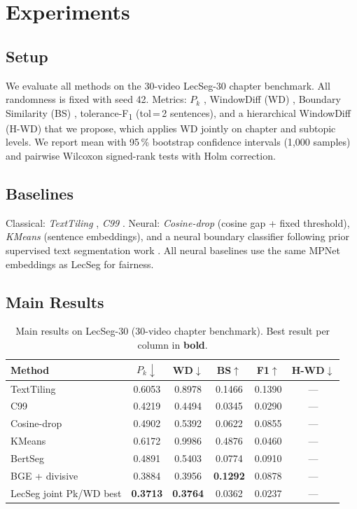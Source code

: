\documentclass[conference]{IEEEtran}
\newcommand{\lecseg}{LecSeg}
\newcommand{\dataset}{LecSeg-30}
\begin{document}
\section{Experiments}

\subsection{Setup}

We evaluate all methods on the 30-video \dataset{} chapter benchmark. All
randomness is fixed with seed 42. Metrics: $P_k$ \cite{beeferman1999_pk},
WindowDiff (WD) \cite{pevzner2002_windowdiff}, Boundary
Similarity (BS) \cite{fournier2013_bs}, tolerance-F\textsubscript{1} (tol\,=\,2 sentences),
and a hierarchical WindowDiff (H-WD) that we propose, which applies WD
jointly on chapter and subtopic levels. We report mean with 95\,\%
bootstrap confidence intervals (1{,}000 samples) and pairwise Wilcoxon
signed-rank tests with Holm correction.

\subsection{Baselines}

Classical: \textit{TextTiling} \cite{hearst1997_texttiling}, \textit{C99} \cite{choi2000_c99}.
Neural: \textit{Cosine-drop} (cosine gap + fixed threshold), \textit{KMeans}
(sentence embeddings), and a neural boundary classifier following prior
supervised text segmentation work \cite{koshorek2018_neural}.
All neural baselines use the same MPNet embeddings as \lecseg{} for fairness.

\subsection{Main Results}

\begin{table}[t]
  \centering
  \caption{Main results on \dataset{} (30-video chapter benchmark).
           Best result per column in \textbf{bold}.}
  \label{tab:main}
  \setlength{\tabcolsep}{4pt}
  \begin{tabular}{lccccc}
    \toprule
    Method & $P_k\downarrow$ & WD$\downarrow$ & BS$\uparrow$ &
             F1$\uparrow$ & H-WD$\downarrow$ \\
    \midrule
    TextTiling  & 0.6053 & 0.8978 & 0.1466 & 0.1390 & --- \\
    C99         & 0.4219 & 0.4494 & 0.0345 & 0.0290 & --- \\
    Cosine-drop & 0.4902 & 0.5392 & 0.0622 & 0.0855 & --- \\
    KMeans      & 0.6172 & 0.9986 & 0.4876 & 0.0460 & --- \\
    BertSeg     & 0.4891 & 0.5403 & 0.0774 & 0.0910 & --- \\
    \midrule
    BGE + divisive &
      0.3884 & 0.3956 & \textbf{0.1292} & 0.0878 & --- \\
    \lecseg{} joint Pk/WD best &
      \textbf{0.3713} & \textbf{0.3764} & 0.0362 &
      0.0237 & --- \\
    \bottomrule
  \end{tabular}
\end{table}
\end{document}
